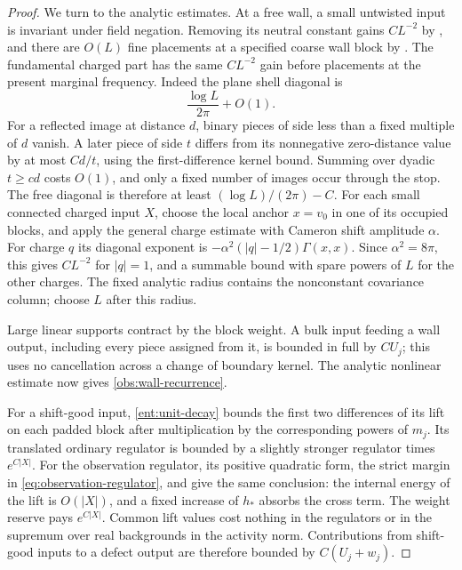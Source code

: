 \begin{proof}
We turn to the analytic estimates.  At a free wall, a small
untwisted input is invariant under field negation.  Removing its
neutral constant gains \(CL^{-2}\) by \cite[Lemma~4.5]{B}, and there
are \(O(L)\) fine placements at a specified coarse wall block by
\cite[Corollary~4.7]{B}.  The fundamental charged part has the same
\(CL^{-2}\) gain before placements at the present marginal frequency.
Indeed the plane shell diagonal is
\[
                         \frac{\log L}{2\pi}+O(1).
\]
For a reflected image at distance \(d\), binary pieces of side less
than a fixed multiple of \(d\) vanish.  A later piece of side \(t\)
differs from its nonnegative zero-distance value by at most \(Cd/t\),
using the first-difference kernel bound.  Summing over dyadic
\(t\ge cd\) costs \(O(1)\), and only a fixed number of images occur
through the stop.  The free diagonal is therefore at least
\((\log L)/(2\pi)-C\).  For each small connected charged input \(X\),
choose the local anchor
\(x=v_0\) in one of its occupied blocks, and apply the general charge
estimate \cite[Equation~(4.26)]{B} with Cameron shift amplitude
\(\alpha\).  For charge \(q\) its diagonal exponent is
\(-\alpha^2(|q|-1/2)\Gamma(x,x)\).  Since \(\alpha^2=8\pi\), this
gives \(CL^{-2}\) for \(|q|=1\), and a summable bound with spare
powers of \(L\) for the other charges.  The fixed analytic radius
contains the nonconstant covariance column; choose \(L\) after
this radius.

Large linear supports contract by the block weight.  A bulk input
feeding a wall output, including every piece assigned from it, is
bounded in full by \(CU_j\); this uses no cancellation across a
change of boundary kernel.  The analytic nonlinear estimate
\cite[Equation~(4.30)]{B} now gives \eqref{obs:wall-recurrence}.

For a shift-good input, \eqref{ent:unit-decay} bounds the first two
differences of its lift on each padded block after multiplication
by the corresponding powers of \(m_j\).  Its translated ordinary
regulator is bounded by a slightly stronger regulator times
\(e^{C|X|}\).  For the observation regulator, its positive quadratic
form, the strict margin in \eqref{eq:observation-regulator}, and
\cite[Equations~(9.14) and~(9.16)]{B} give the same conclusion:
the internal energy of the lift is \(O(|X|)\), and a fixed increase
of \(h_*\) absorbs the cross term.  The weight reserve pays
\(e^{C|X|}\).  Common lift values cost nothing in the regulators
or in the supremum over real backgrounds in the activity norm.
Contributions from shift-good inputs to a defect output are
therefore bounded by \(C(U_j+w_j)\).


\end{proof}
